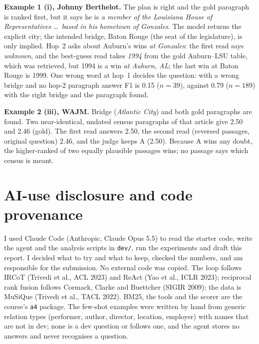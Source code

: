 \documentclass[10pt,a4paper]{article}
\begin{document}
\textbf{Example 1 (i), Johnny Berthelot.} The plan is right and the gold paragraph is ranked first, but it says
he is \emph{a member of the Louisiana House of Representatives \dots\ based in his hometown of Gonzales}. The model
returns the explicit city; the intended bridge, Baton Rouge (the seat of the legislature), is only implied. Hop~2
asks about Auburn's wins \emph{at Gonzales}: the first read says \emph{unknown}, and the best-guess read takes
\emph{1994} from the gold Auburn--LSU table, which was retrieved, but 1994 is a win \emph{at Auburn, AL}; the last
win at Baton Rouge is 1999. One wrong word at hop~1 decides the question: with a wrong bridge and no hop-2 paragraph answer F1 is
0.15 ($n{=}39$), against 0.79 ($n{=}189$) with the right bridge and the paragraph found.

\textbf{Example 2 (iii), WAJM.} Bridge (\emph{Atlantic City}) and both gold paragraphs are found. Two
near-identical, undated census paragraphs of that article give 2.50 and 2.46 (gold). The first read answers 2.50,
the second read (reversed passages, original question) 2.46, and the judge keeps A (2.50). Because A wins any
doubt, the higher-ranked of two equally plausible passages wins; no passage says which census is meant.

\section{AI-use disclosure and code provenance}
I used Claude Code (Anthropic, Claude Opus 5.5) to read the starter code, write the agent and the analysis
scripts in \texttt{dev/}, run the experiments and draft this report. I decided what to try and what to keep,
checked the numbers, and am responsible for the submission. No external code was copied. The loop follows IRCoT
(Trivedi et al., ACL 2023) and ReAct (Yao et al., ICLR 2023); reciprocal rank fusion follows Cormack, Clarke and
Buettcher (SIGIR 2009); the data is MuSiQue (Trivedi et al., TACL 2022). BM25, the tools and the scorer are the
course's \texttt{a4} package. The few-shot examples were written by hand from generic relation types (performer, author,
director, location, employer) with names that are not in dev; none is a dev question or follows one, and the agent
stores no answers and never recognises a question.
\end{document}
